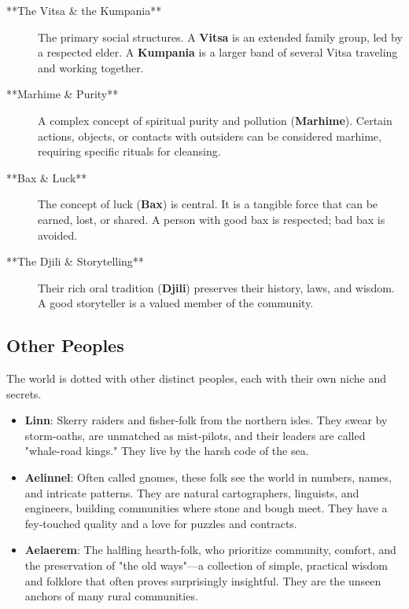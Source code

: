 \begin{tcolorbox}[title=Life on the Road: Tulkani Culture, colback=green!5!white, colframe=green!75!black, fonttitle=\bfseries]
\begin{description}
    \item[**The Vitsa \& the Kumpania**] The primary social structures. A \textbf{Vitsa} is an extended family group, led by a respected elder. A \textbf{Kumpania} is a larger band of several Vitsa traveling and working together.
    \item[**Marhime \& Purity**] A complex concept of spiritual purity and pollution (\textbf{Marhime}). Certain actions, objects, or contacts with outsiders can be considered marhime, requiring specific rituals for cleansing.
    \item[**Bax \& Luck**] The concept of luck (\textbf{Bax}) is central. It is a tangible force that can be earned, lost, or shared. A person with good bax is respected; bad bax is avoided.
    \item[**The Djili \& Storytelling**] Their rich oral tradition (\textbf{Djili}) preserves their history, laws, and wisdom. A good storyteller is a valued member of the community.
\end{description}
\end{tcolorbox}

\subsection*{Other Peoples}

The world is dotted with other distinct peoples, each with their own niche and secrets.

\begin{itemize}
    \item \textbf{Linn}: Skerry raiders and fisher-folk from the northern isles. They swear by storm-oaths, are unmatched as mist-pilots, and their leaders are called "whale-road kings." They live by the harsh code of the sea.
    \item \textbf{Aelinnel}: Often called gnomes, these folk see the world in numbers, names, and intricate patterns. They are natural cartographers, linguists, and engineers, building communities where stone and bough meet. They have a fey-touched quality and a love for puzzles and contracts.
    \item \textbf{Aelaerem}: The halfling hearth-folk, who prioritize community, comfort, and the preservation of "the old ways"—a collection of simple, practical wisdom and folklore that often proves surprisingly insightful. They are the unseen anchors of many rural communities.
\end{itemize}

